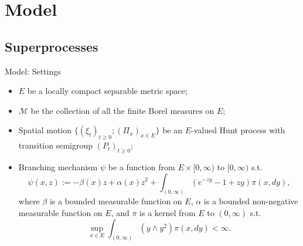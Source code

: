 \documentclass[xcolor=dvipsnames]{beamer}
\begin{document}
\section{Model}
\subsection{Superprocesses}

\begin{frame}{Model: Settings}
\begin{itemize}
\item
  {\color{red}$E$} be a locally compact separable metric space;
\item
  {\color{red} $\mathcal M$} be the collection of all the finite Borel measures on $E$; 
\item
  Spatial motion {\color{red} $\{(\xi_t)_{t\geq 0}; (\Pi_x)_{x\in E}\}$} be an $E$-valued Hunt process with transition semigroup {\color{red} $(P_t)_{t\geq 0}$};
\item
  Branching mechanism {\color{red} $\psi$} be a function from $E\times [0,\infty)$ to $[0,\infty)$ s.t.
\[
  \psi(x,z) 
  := -\beta(x)z+\alpha(x)z^2 +\int_{(0,\infty)}(e^{-zy}-1+zy)\pi(x,dy),
\]
	where $\beta$ is a bounded measurable function on $E$, $\alpha$ is a bounded non-negative measurable function on $E$, and $\pi$ is a kernel from $E$ to $(0,\infty)$ s.t. 
\[
 \sup_{x\in E} \int_{(0,\infty)}(y\wedge y^2)\pi(x,dy)<\infty.
\] 
\end{itemize}
\end{frame}
\end{document}
